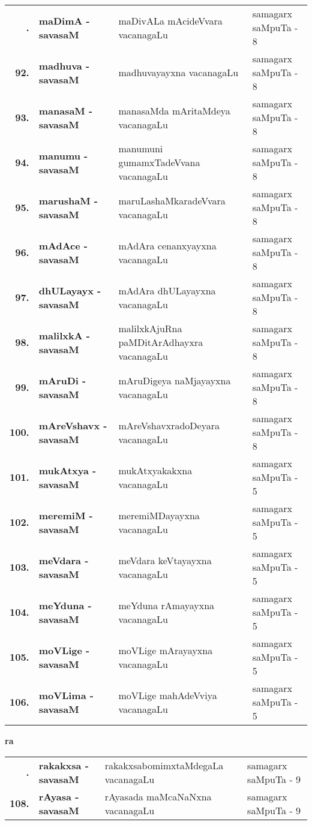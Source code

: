 {\renewcommand{\arraystretch}{1.3}
\begin{longtable}{>{\bf}r>{\bf}l>{\raggedright}p{8cm}l}
\endfirsthead
\endhead
\endfoot
\endlastfoot
91. & maDimA - savasaM &  maDivALa mAcideVvara vacanagaLu & samagarx saMpuTa - 8\\
92. & madhuva - savasaM &  madhuvayayxna vacanagaLu & samagarx saMpuTa - 8\\
93. & manasaM - savasaM & manasaMda mAritaMdeya vacanagaLu & samagarx saMpuTa - 8 \\
94. & manumu - savasaM & manumuni gumamxTadeVvana vacanagaLu & samagarx saMpuTa - 8 \\
95. & marushaM - savasaM & maruLashaMkaradeVvara vacanagaLu & samagarx saMpuTa - 8 \\
96. & mAdAce - savasaM & mAdAra cenanxyayxna vacanagaLu & samagarx saMpuTa - 8 \\
97. & dhULayayx - savasaM & mAdAra dhULayayxna vacanagaLu & samagarx saMpuTa - 8 \\
98. & malilxkA - savasaM & malilxkAjuRna paMDitArAdhayxra vacanagaLu & samagarx saMpuTa - 8 \\
99. & mAruDi - savasaM & mAruDigeya naMjayayxna vacanagaLu & samagarx saMpuTa - 8 \\
100. & mAreVshavx - savasaM & mAreVshavxradoDeyara vacanagaLu & samagarx saMpuTa - 8 \\
101. & mukAtxya - savasaM & mukAtxyakakxna vacanagaLu & samagarx saMpuTa - 5 \\
102. & meremiM - savasaM & meremiMDayayxna vacanagaLu & samagarx saMpuTa - 5 \\
103. & meVdara - savasaM & meVdara keVtayayxna vacanagaLu & samagarx saMpuTa - 5 \\
104. & meYduna - savasaM & meYduna rAmayayxna vacanagaLu & samagarx saMpuTa - 5 \\
105. & moVLige - savasaM & moVLige mArayayxna vacanagaLu & samagarx saMpuTa - 5 \\
106. & moVLima - savasaM & moVLige mahAdeVviya vacanagaLu & samagarx saMpuTa - 5
\end{longtable}}
\smallskip

\centerline{\bf ra}

{\renewcommand{\arraystretch}{1.3}
\begin{longtable}{>{\bf}r>{\bf}l>{\raggedright}p{8cm}l}
\endfirsthead
\endhead
\endfoot
\endlastfoot
107. & rakakxsa - savasaM & rakakxsabomimxtaMdegaLa vacanagaLu &  samagarx saMpuTa - 9\\
108. & rAyasa - savasaM &  rAyasada maMcaNaNxna vacanagaLu & samagarx saMpuTa - 9
\end{longtable}}

